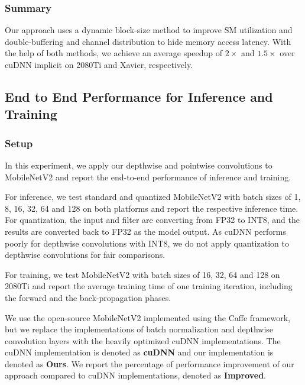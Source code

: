 \subsubsection{Summary} Our approach uses a dynamic block-size method to improve SM utilization and double-buffering and channel distribution to hide
memory access latency. With the help of both methods, we achieve an average speedup of $2\times$ and $1.5\times$ over cuDNN implicit on
2080Ti and Xavier, respectively.





\subsection{End to End Performance for Inference and Training}
\label{sec:inferexp}
\subsubsection{Setup}
In this experiment, we apply our depthwise and pointwise convolutions to MobileNetV2 and report the end-to-end performance of inference and
training.

 For inference, we test standard and quantized MobileNetV2 with batch sizes of 1, 8, 16, 32, 64 and 128 on both
platforms and report the respective inference time. For quantization, the input and filter are converting from FP32 to INT8, and the
results are converted back to FP32 as the model output. As cuDNN performs poorly for depthwise convolutions with INT8, we do not apply
quantization to depthwise convolutions for fair comparisons.

 For training, we test MobileNetV2 with batch sizes of 16, 32, 64 and 128 on 2080Ti and report the average training time
of one training iteration, including the forward and the back-propagation phases.

 We use the open-source MobileNetV2 implemented using the Caffe framework, but we replace the
implementations of batch normalization and depthwise convolution layers with the heavily optimized cuDNN implementations. The cuDNN
implementation is denoted as \textbf{cuDNN} and our implementation is denoted as \textbf{Ours}. We report the percentage of performance
improvement of our approach compared to cuDNN implementations, denoted as \textbf{Improved}.


